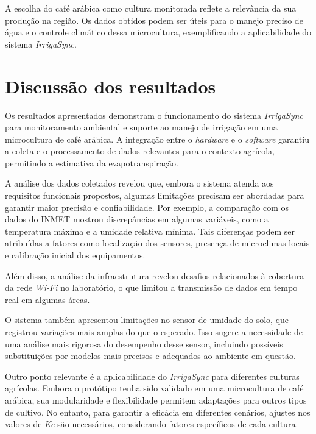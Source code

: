 A escolha do café arábica como cultura monitorada reflete a relevância da sua produção na região. Os dados obtidos podem ser úteis para o manejo preciso de água e o controle climático dessa microcultura, exemplificando a aplicabilidade do sistema \textit{IrrigaSync}.

\section{Discussão dos resultados}

Os resultados apresentados demonstram o funcionamento do sistema \textit{IrrigaSync} para monitoramento ambiental e suporte ao manejo de irrigação em uma microcultura de café arábica. A integração entre o \textit{hardware} e o \textit{software} garantiu a coleta e o processamento de dados relevantes para o contexto agrícola, permitindo a estimativa da evapotranspiração.

A análise dos dados coletados revelou que, embora o sistema atenda aos requisitos funcionais propostos, algumas limitações precisam ser abordadas para garantir maior precisão e confiabilidade. Por exemplo, a comparação com os dados do INMET mostrou discrepâncias em algumas variáveis, como a temperatura máxima e a umidade relativa mínima. Tais diferenças podem ser atribuídas a fatores como localização dos sensores, presença de microclimas locais e calibração inicial dos equipamentos.  

Além disso, a análise da infraestrutura revelou desafios relacionados à cobertura da rede \textit{Wi-Fi} no laboratório, o que limitou a transmissão de dados em tempo real em algumas áreas. 

O sistema também apresentou limitações no sensor de umidade do solo, que registrou variações mais amplas do que o esperado. Isso sugere a necessidade de uma análise mais rigorosa do desempenho desse sensor, incluindo possíveis substituições por modelos mais precisos e adequados ao ambiente em questão.  

Outro ponto relevante é a aplicabilidade do \textit{IrrigaSync} para diferentes culturas agrícolas. Embora o protótipo tenha sido validado em uma microcultura de café arábica, sua modularidade e flexibilidade permitem adaptações para outros tipos de cultivo. No entanto, para garantir a eficácia em diferentes cenários, ajustes nos valores de \textit{Kc} são necessários, considerando fatores específicos de cada cultura.  

